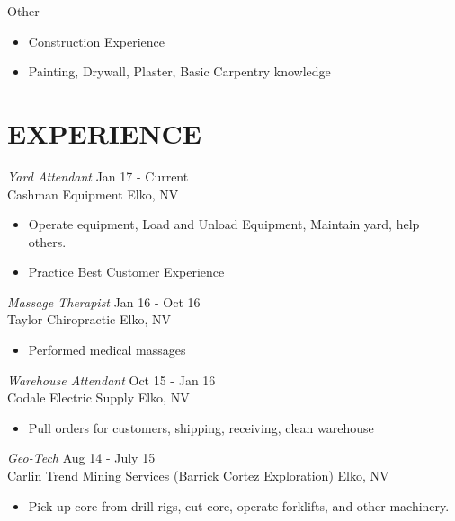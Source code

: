\documentclass[margin, 10pt]{res} %
\begin{document}
\begin{resume}
    Other
\begin{itemize} \itemsep -2pt
        \item Construction Experience
        \item Painting, Drywall, Plaster, Basic Carpentry knowledge 
    \end{itemize} 
     
     
    \section{EXPERIENCE}

    {\sl Yard Attendant  } \hfill Jan 17 - Current \\
    Cashman Equipment Elko, NV

\begin{itemize} \itemsep -2pt %
        \item Operate equipment, Load and Unload Equipment, Maintain yard, help others. 
        \item Practice Best Customer Experience
    \end{itemize}
     
    {\sl Massage Therapist} \hfill Jan 16 - Oct 16 \\
    Taylor Chiropractic Elko, NV
    \begin{itemize} 
        \item Performed medical massages
    \end{itemize} 

    {\sl Warehouse Attendant} \hfill Oct 15 - Jan 16 \\
    Codale Electric Supply Elko, NV
    \begin{itemize}
        \item Pull orders for customers, shipping, receiving, clean warehouse 
    \end{itemize} 

    {\sl Geo-Tech} \hfill Aug 14 - July 15 \\
    Carlin Trend Mining Services (Barrick Cortez Exploration)  Elko, NV
    \begin{itemize}
        \item Pick up core from drill rigs, cut core, operate forklifts, and other machinery.
    \end{itemize} 


\end{resume}
\end{document}
